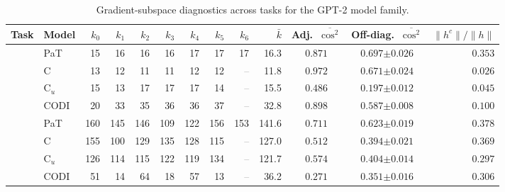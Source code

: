 \begin{table}[h!]
\centering
\small
\setlength{\tabcolsep}{2.5pt}
\caption{Gradient-subspace diagnostics across tasks for the GPT-2 model family.}
\label{tab:subspace_geometry_gpt2}
\begin{tabular}{llrrrrrrrrccr}
\toprule
Task & Model & $k_{0}$ & $k_{1}$ & $k_{2}$ & $k_{3}$ & $k_{4}$ & $k_{5}$ & $k_{6}$ & $\bar k$ & Adj.\ $\overline{\cos^2}$ & Off-diag.\ $\overline{\cos^2}$ & $\|h^c\|/\|h\|$ \\
\midrule
{} & PaT & 15 & 16 & 16 & 16 & 17 & 17 & 17 & 16.3 & $0.871$ & $0.697 {\scriptstyle \pm 0.026}$ & $0.353$ \\
 & C & 13 & 12 & 11 & 11 & 12 & 12 & \textcolor{gray}{--} & 11.8 & $0.972$ & $0.671 {\scriptstyle \pm 0.024}$ & $0.026$ \\
 & C$_u$ & 15 & 13 & 17 & 17 & 17 & 14 & \textcolor{gray}{--} & 15.5 & $0.486$ & $0.197 {\scriptstyle \pm 0.012}$ & $0.045$ \\
 & CODI & 20 & 33 & 35 & 36 & 36 & 37 & \textcolor{gray}{--} & 32.8 & $0.898$ & $0.587 {\scriptstyle \pm 0.008}$ & $0.100$ \\
\midrule
{} & PaT & 160 & 145 & 146 & 109 & 122 & 156 & 153 & 141.6 & $0.711$ & $0.623 {\scriptstyle \pm 0.019}$ & $0.378$ \\
 & C & 155 & 100 & 129 & 135 & 128 & 115 & \textcolor{gray}{--} & 127.0 & $0.512$ & $0.394 {\scriptstyle \pm 0.021}$ & $0.369$ \\
 & C$_u$ & 126 & 114 & 115 & 122 & 119 & 134 & \textcolor{gray}{--} & 121.7 & $0.574$ & $0.404 {\scriptstyle \pm 0.014}$ & $0.297$ \\
 & CODI & 51 & 14 & 64 & 18 & 57 & 13 & \textcolor{gray}{--} & 36.2 & $0.271$ & $0.351 {\scriptstyle \pm 0.016}$ & $0.306$ \\
\bottomrule
\end{tabular}
\end{table}
